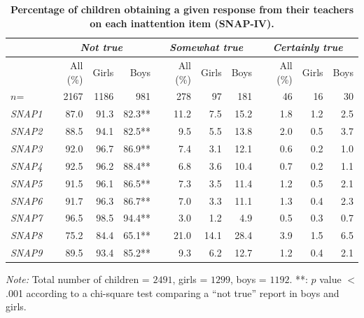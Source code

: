 \documentclass[10pt,letterpaper]{article}
\begin{document}
\begin{table}[!ht]
\begin{adjustwidth}{-5mm}{0in} %
\centering
\caption{ \bf Percentage of children obtaining a given response from their teachers on each inattention item (SNAP-IV).} 
\vspace{5mm}
\begin{tabular}{|lrrr|rrr|rrr|}
\hline
                & \multicolumn{3}{c|}{\emph{Not true}}  &  \multicolumn{3}{c}{\emph{Somewhat true}}\ &  \multicolumn{3}{|c|}{\emph{Certainly true}}\\ \hline
                    & All  (\%) & Girls & Boys  & All (\%)  & Girls & Boys & All  (\%) & Girls & Boys\\  
                     $n$=&2167 & 1186 & 981 &278 &97 & 181 &46 & 16 & 30\\\hline
{\it SNAP1}   & 87.0 & 91.3 & 82.3**  & 11.2 & 7.5   & 15.2  & 1.8 & 1.2 & 2.5\\  \hline
{\it SNAP2}  &88.5 & 94.1   & 82.5** & 9.5 & 5.5 & 13.8 & 2.0 & 0.5 & 3.7\\  \hline
{\it SNAP3}   & 92.0  &  96.7 &  86.9** & 7.4 & 3.1 & 12.1 & 0.6 & 0.2 & 1.0 \\   \hline
{\it SNAP4}   & 92.5  & 96.2   & 88.4**  & 6.8 & 3.6 & 10.4 & 0.7& 0.2 & 1.1 \\   \hline
{\it SNAP5}  &  91.5 & 96.1 & 86.5**  & 7.3 & 3.5  & 11.4  &1.2 & 0.5 & 2.1  \\   \hline
{\it SNAP6}   & 91.7 & 96.3 & 86.7**  & 7.0 & 3.3 & 11.1 & 1.3 & 0.4 & 2.3 \\   \hline
{\it SNAP7}   & 96.5 & 98.5   & 94.4**   & 3.0  & 1.2 & 4.9 & 0.5 & 0.3 & 0.7 \\   \hline
{\it SNAP8}   & 75.2 & 84.4   & 65.1**  & 21.0  & 14.1  & 28.4 &  3.9 & 1.5 & 6.5\\    \hline
{\it SNAP9}   & 89.5 & 93.4 & 85.2** & 9.3 & 6.2 & 12.7 & 1.2 & 0.4  & 2.1 \\  \hline
\end{tabular}
\label{Numerical_SNAP}
\end{adjustwidth}
\textit{Note:} {Total number of children = $2491$, girls = $1299$, boys = $1192$.  **: $p$ value $<$.001 according to a chi-square test comparing a ``not true'' report in boys and girls.} \\ 
\end{table}
\end{document}
